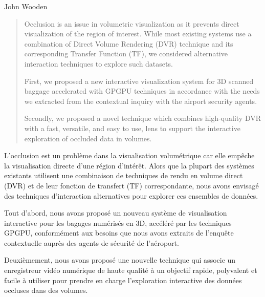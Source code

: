 \documentclass[
11pt, %
english, %
onehalfspacing %
parskip, %
headsepline, %
]{MastersDoctoralThesis} %
\begin{document}
\hfill John Wooden 


\begin{abstract}
\addchaptertocentry{\abstractname} %
Occlusion is an issue in volumetric visualization as it prevents direct visualization of the region of interest.
While most existing systems use a combination of Direct Volume Rendering (DVR) technique and its corresponding Transfer Function (TF), we considered alternative interaction techniques to explore such datasets. 

First, we proposed a new interactive visualization system for 3D scanned baggage accelerated with GPGPU techniques in accordance with the needs we extracted from the contextual inquiry with the airport security agents. 

Secondly, we proposed a novel technique which combines high-quality DVR with a fast, versatile, and easy to use, lens to support the interactive exploration of occluded data in volumes.
\end{abstract}



\begin{resume}
\addchaptertocentry{\resumename} %
L'occlusion est un problème dans la visualisation volumétrique car elle empêche la visualisation directe d'une région d'intérêt.
Alors que la plupart des systèmes existants utilisent une combinaison de techniques de rendu en volume direct (DVR) et de leur fonction de transfert (TF) correspondante, nous avons envisagé des techniques d'interaction alternatives pour explorer ces ensembles de données.

Tout d'abord, nous avons proposé un nouveau système de visualisation interactive pour les bagages numérisés en 3D, accéléré par les techniques GPGPU, conformément aux besoins que nous avons extraits de l'enquête contextuelle auprès des agents de sécurité de l'aéroport.

Deuxièmement, nous avons proposé une nouvelle technique qui associe un enregistreur vidéo numérique de haute qualité à un objectif rapide, polyvalent et facile à utiliser pour prendre en charge l'exploration interactive des données occluses dans des volumes.
\end{resume}
\end{document}
